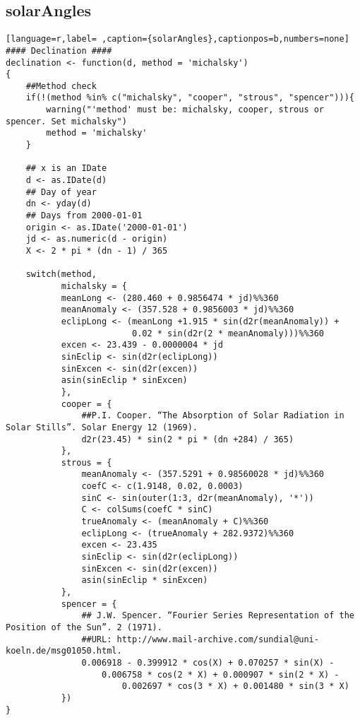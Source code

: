 \subsection{solarAngles}
\label{sec:orga7f68d4}
\label{subsec:solarangles}
\begin{lstlisting}[language=r,label= ,caption={solarAngles},captionpos=b,numbers=none]
#### Declination ####
declination <- function(d, method = 'michalsky')
{
    ##Method check
    if(!(method %in% c("michalsky", "cooper", "strous", "spencer"))){
        warning("'method' must be: michalsky, cooper, strous or spencer. Set michalsky")
        method = 'michalsky'
    }

    ## x is an IDate
    d <- as.IDate(d)
    ## Day of year
    dn <- yday(d)
    ## Days from 2000-01-01
    origin <- as.IDate('2000-01-01')
    jd <- as.numeric(d - origin)
    X <- 2 * pi * (dn - 1) / 365

    switch(method,
           michalsky = {
           meanLong <- (280.460 + 0.9856474 * jd)%%360
           meanAnomaly <- (357.528 + 0.9856003 * jd)%%360
           eclipLong <- (meanLong +1.915 * sin(d2r(meanAnomaly)) +
                         0.02 * sin(d2r(2 * meanAnomaly)))%%360
           excen <- 23.439 - 0.0000004 * jd
           sinEclip <- sin(d2r(eclipLong))
           sinExcen <- sin(d2r(excen))
           asin(sinEclip * sinExcen)
           },
           cooper = {
               ##P.I. Cooper. “The Absorption of Solar Radiation in Solar Stills”. Solar Energy 12 (1969).
               d2r(23.45) * sin(2 * pi * (dn +284) / 365)
           },
           strous = {
               meanAnomaly <- (357.5291 + 0.98560028 * jd)%%360
               coefC <- c(1.9148, 0.02, 0.0003)
               sinC <- sin(outer(1:3, d2r(meanAnomaly), '*'))
               C <- colSums(coefC * sinC)
               trueAnomaly <- (meanAnomaly + C)%%360
               eclipLong <- (trueAnomaly + 282.9372)%%360
               excen <- 23.435
               sinEclip <- sin(d2r(eclipLong))
               sinExcen <- sin(d2r(excen))
               asin(sinEclip * sinExcen)
           },
           spencer = {
               ## J.W. Spencer. “Fourier Series Representation of the Position of the Sun”. 2 (1971).
               ##URL: http://www.mail-archive.com/sundial@uni-koeln.de/msg01050.html.
               0.006918 - 0.399912 * cos(X) + 0.070257 * sin(X) -
                   0.006758 * cos(2 * X) + 0.000907 * sin(2 * X) -
                       0.002697 * cos(3 * X) + 0.001480 * sin(3 * X)           
           })
}



\end{lstlisting}
